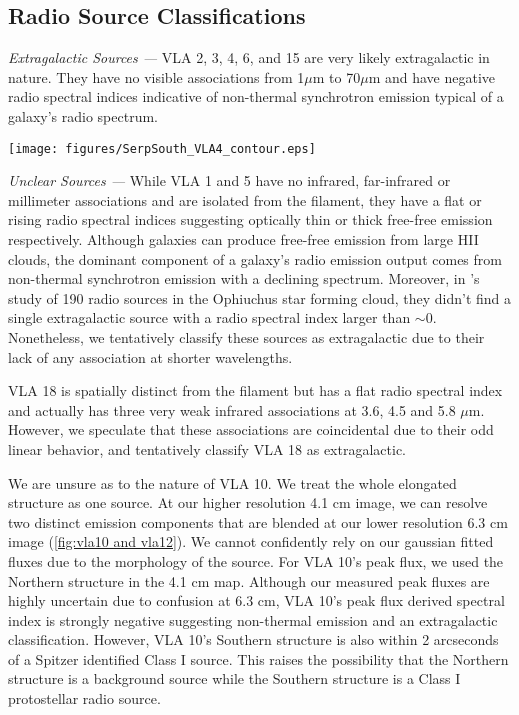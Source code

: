 \documentclass[apj]{emulateapj}
\begin{document}
\subsection{Radio Source Classifications}
\label{sec:radio source classifications}

\newcommand{\sourcenote}[1]{\textit{#1 ---}}

\sourcenote{Extragalactic Sources}
VLA 2, 3, 4, 6, and 15 are very likely extragalactic in nature. They have no visible associations from 1$\mu$m to 70$\mu$m and have negative radio spectral indices indicative of non-thermal synchrotron emission typical of a galaxy's radio spectrum.

\begin{figure*}
\label{fig:vla4}
\centering
\texttt{[image: figures/SerpSouth\_VLA4\_contour.eps]}
\caption{\small{ 
}}
\end{figure*}

\sourcenote{Unclear Sources}
While VLA 1 and 5 have no infrared, far-infrared or millimeter associations and are isolated from the filament, they have a flat or rising radio spectral indices suggesting optically thin or thick free-free emission respectively. Although galaxies can produce free-free emission from large HII clouds, the dominant component of a galaxy's radio emission output comes from non-thermal synchrotron emission with a declining spectrum. Moreover, in \citet{Dzib13}'s study of 190 radio sources in the Ophiuchus star forming cloud, they didn't find a single extragalactic source with a radio spectral index larger than $\sim$0. Nonetheless, we tentatively classify these sources as extragalactic due to their lack of any association at shorter wavelengths. 

VLA 18 is spatially distinct from the filament but has a flat radio spectral index and actually has three very weak infrared associations at 3.6, 4.5 and 5.8 $\mu$m. However, we speculate that these associations are coincidental due to their odd linear behavior, and tentatively classify VLA 18 as extragalactic. 

We are unsure as to the nature of VLA 10. We treat the whole elongated structure as one source. At our higher resolution 4.1 cm image, we can resolve two distinct emission components that are blended at our lower resolution 6.3 cm image (\autoref{fig:vla10 and vla12}). We cannot confidently rely on our gaussian fitted fluxes due to the morphology of the source. For VLA 10's peak flux, we used the Northern structure in the 4.1 cm map. Although our measured peak fluxes are highly uncertain due to confusion at 6.3 cm, VLA 10's peak flux derived spectral index is strongly negative suggesting non-thermal emission and an extragalactic classification. However, VLA 10's Southern structure is also within 2 arcseconds of a Spitzer identified Class I source. This raises the possibility that the Northern structure is a background source while the Southern structure is a Class I protostellar radio source. 
\end{document}
